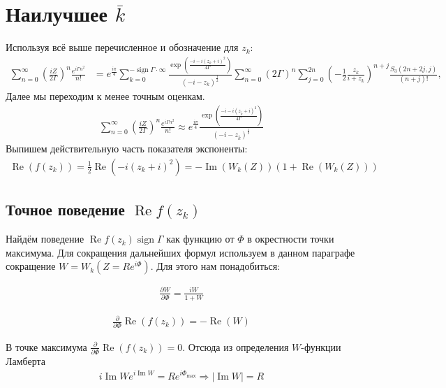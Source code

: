 \documentclass[a4paper, 12pt]{article}
\DeclareMathOperator*{\sign}{sign}
\DeclareMathOperator*{\Real}{Re}
\DeclareMathOperator*{\Imag}{Im}
\newenvironment{eqw}{\begin{equation} \begin{aligned}}   
    {\end{aligned}    \end{equation}}
\begin{document}
\section*{Наилучшее $\bar k$}
Используя всё выше перечисленное и обозначение для $z_k$:
\begin{eqw}
    \sum\limits_{n=0}^{\infty}\left(\frac{iZ}{2\Gamma}\right)^n  \frac{e^{i\Gamma n^2}}{n!} &= e^{\frac{i\pi}{4}}
    \sum\limits_{k=0}^{-\sign\Gamma\cdot\infty} \frac{\exp\left(\frac{-i-i(z_k+i)^2}{4\Gamma}\right)}{(-i-z_k)^{\frac{1}{2}}}
    \sum\limits_{n=0}^{\infty}\left(2\Gamma\right)^n
    \sum\limits_{j=0}^{2n}\left(-\frac{1}{2}\frac{z_k}{i+z_k}\right)^{n+j}\frac{S_3(2n+2j, j)}{(n+j)!},
\end{eqw}
Далее мы переходим к менее точным оценкам.
\begin{eqw}\label{approx_exact_row}
    \sum\limits_{n=0}^{\infty}\left(\frac{iZ}{2\Gamma}\right)^n  \frac{e^{i\Gamma n^2}}{n!} \approx 
    e^{\frac{i\pi}{4}} \frac{\exp\left(\frac{-i-i(z_{\bar k}+i)^2}{4\Gamma}\right)}{(-i-z_{\bar k})^{\frac{1}{2}}}
\end{eqw}
Выпишем действительную часть показателя экспоненты:
\begin{eqw}
    \Real\left(f(z_k)\right) = \frac{1}{2}\Real\left(-i(z_k+i)^2\right) = -\Imag(W_k(Z))\left(1+\Real(W_k(Z))\right)
\end{eqw}
\subsection*{Точное поведение $\Real f(z_k)$}
Найдём поведение $\Real f(z_k)\sign \Gamma$ как функцию от $\Phi$ в окрестности точки максимума. Для сокращения дальнейших формул используем в данном параграфе сокращение $W = W_k(Z=R e^{i\Phi})$. Для этого нам понадобиться:

\begin{eqw}
    \frac{\partial W}{\partial \Phi} = \frac{iW}{1+W}
\end{eqw}

\begin{eqw}
    \frac{\partial}{\partial\Phi}\Real\left(f(z_k)\right) = -\Real(W)
\end{eqw}

В точке максимума $\frac{\partial}{\partial\Phi}\Real\left(f(z_k)\right) = 0$. Отсюда из определения $W$-функции Ламберта
\begin{eqw}
    i\Imag W e^{i\Imag W} = R e^{i\Phi_{\max}} \Rightarrow \left|\Imag W\right| = R
\end{eqw}
\end{document}
